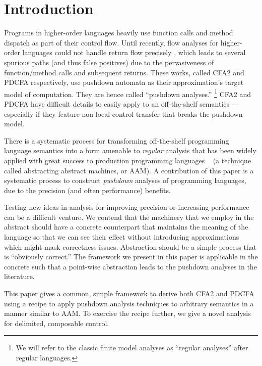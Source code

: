 \section{Introduction}

Programs in higher-order languages heavily use function calls and method dispatch as part of their control flow.
%
Until recently, flow analyses for higher-order languages could not handle return flow precisely \citep{ianjohnson:vardoulakis-lmcs11, ianjohnson:earl2010pdcfa}, which leads to several spurious paths (and thus false positives) due to the pervasiveness of function/method calls and subsequent returns.
%
These works, called CFA2 and PDCFA respectively, use pushdown automata as their approximation's target model of computation.
%
They are hence called ``pushdown analyses.''
%
\footnote{We will refer to the classic finite model analyses as ``regular analyses'' after regular languages.}
%
CFA2 and PDCFA have difficult details to easily apply to an off-the-shelf semantics --- especially if they feature non-local control transfer that breaks the pushdown model.

There is a systematic process for transforming off-the-shelf programming language semantics into a form amenable to \emph{regular} analysis that has been widely applied with great success to production programming languages ~\citet{dvanhorn:VanHorn2010Abstracting} (a technique called abstracting abstract machines, or AAM).
%
A contribution of this paper is a systematic process to construct \emph{pushdown} analyses of programming languages, due to the precision (and often performance) benefits.

Testing new ideas in analysis for improving precision or increasing performance can be a difficult venture.
%
We contend that the machinery that we employ in the abstract should have a concrete counterpart that maintains the meaning of the language so that we can see their effect without introducing approximations which might mask correctness issues.
%
Abstraction should be a simple process that is ``obviously correct.''
%
The framework we present in this paper is applicable in the concrete such that a point-wise abstraction leads to the pushdown analyses in the literature.

This paper gives a common, simple framework to derive both CFA2 and PDCFA using a recipe to apply pushdown analysis techniques to arbitrary semantics in a manner similar to AAM.
%
To exercise the recipe further, we give a novel analysis for delimited, composable control. \\

